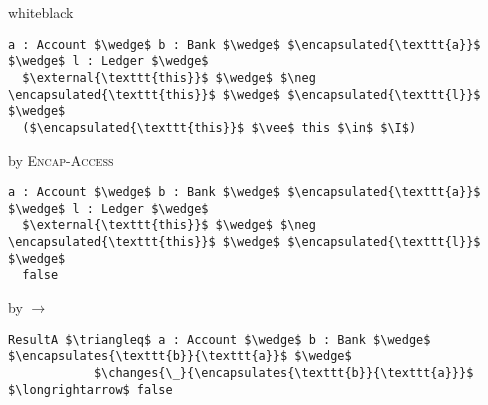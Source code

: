 \begin{proofBox}{white}{black}
\begin{minipage}{0.75\textwidth}
\begin{lstlisting}[language = Chainmail, mathescape=true]
a : Account $\wedge$ b : Bank $\wedge$ $\encapsulated{\texttt{a}}$ $\wedge$ l : Ledger $\wedge$
  $\external{\texttt{this}}$ $\wedge$ $\neg \encapsulated{\texttt{this}}$ $\wedge$ $\encapsulated{\texttt{l}}$ $\wedge$
  ($\encapsulated{\texttt{this}}$ $\vee$ this $\in$ $\I$)
\end{lstlisting}
\end{minipage}
\begin{minipage}{0.24\textwidth}
\scriptsize
\hfill by \textsc{Encap-Access}
\end{minipage}
\begin{minipage}{0.75\textwidth}
\begin{lstlisting}[language = Chainmail, mathescape=true]
a : Account $\wedge$ b : Bank $\wedge$ $\encapsulated{\texttt{a}}$ $\wedge$ l : Ledger $\wedge$
  $\external{\texttt{this}}$ $\wedge$ $\neg \encapsulated{\texttt{this}}$ $\wedge$ $\encapsulated{\texttt{l}}$ $\wedge$
  false
\end{lstlisting}
\end{minipage}
\begin{minipage}{0.24\textwidth}
\scriptsize
\hfill by $\longrightarrow$
\end{minipage}
\begin{minipage}{0.75\textwidth}
\begin{lstlisting}[language = Chainmail, mathescape=true, frame=none]
ResultA $\triangleq$ a : Account $\wedge$ b : Bank $\wedge$ $\encapsulates{\texttt{b}}{\texttt{a}}$ $\wedge$ 
            $\changes{\_}{\encapsulates{\texttt{b}}{\texttt{a}}}$ $\longrightarrow$ false
\end{lstlisting}
\end{minipage}
\begin{minipage}{0.24\textwidth}
\end{minipage}
\end{proofBox}


